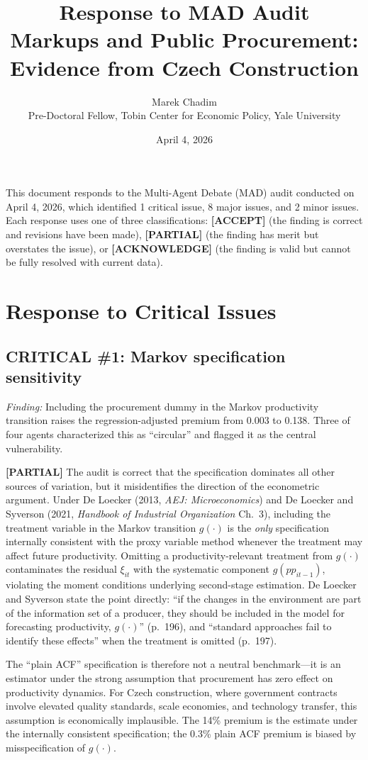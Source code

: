 \documentclass[11pt]{article}
\title{Response to MAD Audit\\[0.5em]
\large Markups and Public Procurement: Evidence from Czech Construction}
\author{Marek Chadim\\\small Pre-Doctoral Fellow, Tobin Center for Economic Policy, Yale University}
\date{April 4, 2026}
\newcommand{\accept}{\textcolor{accept}{\textbf{[ACCEPT]}}}
\newcommand{\partialresp}{\textcolor{partial}{\textbf{[PARTIAL]}}}
\newcommand{\acknowledge}{\textcolor{acknowledge}{\textbf{[ACKNOWLEDGE]}}}
\begin{document}
\maketitle

\noindent This document responds to the Multi-Agent Debate (MAD) audit conducted on April 4, 2026, which identified 1 critical issue, 8 major issues, and 2 minor issues. Each response uses one of three classifications: \accept{} (the finding is correct and revisions have been made), \partialresp{} (the finding has merit but overstates the issue), or \acknowledge{} (the finding is valid but cannot be fully resolved with current data).

\section{Response to Critical Issues}

\subsection*{CRITICAL \#1: Markov specification sensitivity}

\textit{Finding:} Including the procurement dummy in the Markov productivity transition raises the regression-adjusted premium from 0.003 to 0.138. Three of four agents characterized this as ``circular'' and flagged it as the central vulnerability.

\partialresp{} The audit is correct that the specification dominates all other sources of variation, but it misidentifies the direction of the econometric argument. Under De Loecker (2013, \emph{AEJ: Microeconomics}) and De Loecker and Syverson (2021, \emph{Handbook of Industrial Organization} Ch.~3), including the treatment variable in the Markov transition $g(\cdot)$ is the \emph{only} specification internally consistent with the proxy variable method whenever the treatment may affect future productivity. Omitting a productivity-relevant treatment from $g(\cdot)$ contaminates the residual $\xi_{it}$ with the systematic component $g(pp_{it-1})$, violating the moment conditions underlying second-stage estimation. De Loecker and Syverson state the point directly: ``if the changes in the environment are part of the information set of a producer, they should be included in the model for forecasting productivity, $g(\cdot)$'' (p.~196), and ``standard approaches fail to identify these effects'' when the treatment is omitted (p.~197).

The ``plain ACF'' specification is therefore not a neutral benchmark---it is an estimator under the strong assumption that procurement has zero effect on productivity dynamics. For Czech construction, where government contracts involve elevated quality standards, scale economies, and technology transfer, this assumption is economically implausible. The 14\% premium is the estimate under the internally consistent specification; the 0.3\% plain ACF premium is biased by misspecification of $g(\cdot)$.
\end{document}
